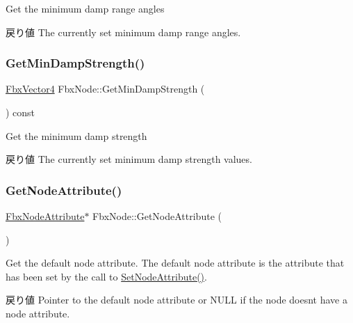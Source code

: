 Get the minimum damp range angles \begin{DoxyReturn}{戻り値}
The currently set minimum damp range angles. 
\end{DoxyReturn}
\mbox{\label{class_fbx_node_a162d1547949a84fa51a0a204c49ef38c}} 
\subsubsection{\texorpdfstring{Get\+Min\+Damp\+Strength()}{GetMinDampStrength()}}
{\footnotesize\ttfamily \hyperlink{class_fbx_vector4}{Fbx\+Vector4} Fbx\+Node\+::\+Get\+Min\+Damp\+Strength (\begin{DoxyParamCaption}{ }\end{DoxyParamCaption}) const}

Get the minimum damp strength \begin{DoxyReturn}{戻り値}
The currently set minimum damp strength values. 
\end{DoxyReturn}
\mbox{\label{class_fbx_node_a9a64977e72b4da5dcbd80673c444b848}} 
\subsubsection{\texorpdfstring{Get\+Node\+Attribute()}{GetNodeAttribute()}\hspace{0.1cm}{\footnotesize\ttfamily [1/2]}}
{\footnotesize\ttfamily \hyperlink{class_fbx_node_attribute}{Fbx\+Node\+Attribute}$\ast$ Fbx\+Node\+::\+Get\+Node\+Attribute (\begin{DoxyParamCaption}{ }\end{DoxyParamCaption})}

Get the default node attribute. The default node attribute is the attribute that has been set by the call to \hyperlink{class_fbx_node_adb194a043dd1ccf3bc1e3bda520dc97a}{Set\+Node\+Attribute()}. \begin{DoxyReturn}{戻り値}
Pointer to the default node attribute or {\ttfamily N\+U\+LL} if the node doesn\textquotesingle{}t have a node attribute. 
\end{DoxyReturn}
\mbox{\label{class_fbx_node_a50143654f42152678c11f0c82cd028c2}} 
